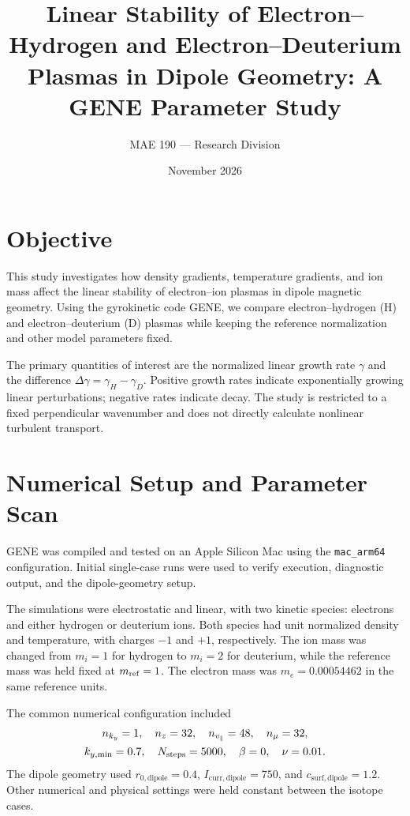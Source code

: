 \documentclass[10pt,letterpaper]{article}
\title{\vspace{-1.3cm}
Linear Stability of Electron--Hydrogen and
Electron--Deuterium Plasmas in Dipole Geometry:
A GENE Parameter Study}
\author{MAE 190 --- Research Division}
\date{November 2026}
\begin{document}
\maketitle
\vspace{-0.7cm}

\section{Objective}

This study investigates how density gradients, temperature
gradients, and ion mass affect the linear stability of
electron--ion plasmas in dipole magnetic geometry. Using the
gyrokinetic code GENE, we compare electron--hydrogen (H)
and electron--deuterium (D) plasmas while keeping the
reference normalization and other model parameters fixed.

The primary quantities of interest are the normalized
linear growth rate $\gamma$ and the difference
$\Delta\gamma=\gamma_H-\gamma_D$.
Positive growth rates indicate exponentially growing
linear perturbations; negative rates indicate decay.
The study is restricted to a fixed perpendicular
wavenumber and does not directly calculate nonlinear
turbulent transport.

\section{Numerical Setup and Parameter Scan}

GENE was compiled and tested on an Apple Silicon Mac
using the \texttt{mac\_arm64} configuration. Initial
single-case runs were used to verify execution,
diagnostic output, and the dipole-geometry setup.

The simulations were electrostatic and linear, with
two kinetic species: electrons and either hydrogen
or deuterium ions. Both species had unit normalized
density and temperature, with charges $-1$ and $+1$,
respectively. The ion mass was changed from
$m_i=1$ for hydrogen to $m_i=2$ for deuterium,
while the reference mass was held fixed at $m_{\rm ref}=1$.
The electron mass was $m_e=0.00054462$ in the same
reference units.

The common numerical configuration included
\[
\begin{gathered}
n_{k_y}=1,\quad n_z=32,\quad n_{v_\parallel}=48,
\quad n_\mu=32,\\
k_{y,\min}=0.7,\quad
N_{\rm steps}=5000,\quad
\beta=0,\quad \nu=0.01.
\end{gathered}
\]
The dipole geometry used
$r_{0,\mathrm{dipole}}=0.4$,
$I_{\mathrm{curr,dipole}}=750$, and
$c_{\mathrm{surf,dipole}}=1.2$.
Other numerical and physical settings were held
constant between the isotope cases.
\end{document}

